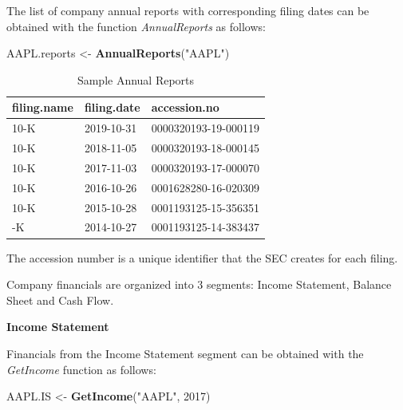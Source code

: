 \documentclass[]{book}
\newenvironment{Shaded}{\begin{snugshade}}{\end{snugshade}}
\newcommand{\KeywordTok}[1]{\textcolor[rgb]{0.13,0.29,0.53}{\textbf{#1}}}
\newcommand{\DecValTok}[1]{\textcolor[rgb]{0.00,0.00,0.81}{#1}}
\newcommand{\StringTok}[1]{\textcolor[rgb]{0.31,0.60,0.02}{#1}}
\newcommand{\NormalTok}[1]{#1}
\theoremstyle{definition}
\theoremstyle{definition}
\theoremstyle{definition}
\theoremstyle{remark}
\begin{document}
The list of company annual reports with corresponding filing dates can
be obtained with the function \emph{AnnualReports} as follows:

\begin{Shaded}
\begin{Highlighting}[]
\NormalTok{AAPL.reports <-}\StringTok{ }\KeywordTok{AnnualReports}\NormalTok{(}\StringTok{"AAPL"}\NormalTok{)}
\end{Highlighting}
\end{Shaded}

\begin{table}[t]

\caption{\label{tab:unnamed-chunk-25}Sample Annual Reports}
\centering
\begin{tabular}{lll}
\toprule
filing.name & filing.date & accession.no\\
\midrule
10-K & 2019-10-31 & 0000320193-19-000119\\
10-K & 2018-11-05 & 0000320193-18-000145\\
10-K & 2017-11-03 & 0000320193-17-000070\\
10-K & 2016-10-26 & 0001628280-16-020309\\
10-K & 2015-10-28 & 0001193125-15-356351\\
\addlinespace
10-K & 2014-10-27 & 0001193125-14-383437\\
\bottomrule
\end{tabular}
\end{table}

The accession number is a unique identifier that the SEC creates for
each filing.

Company financials are organized into 3 segments: Income Statement,
Balance Sheet and Cash Flow.

\textbf{Income Statement}

Financials from the Income Statement segment can be obtained with the
\emph{GetIncome} function as follows:

\begin{Shaded}
\begin{Highlighting}[]
\NormalTok{AAPL.IS <-}\StringTok{ }\KeywordTok{GetIncome}\NormalTok{(}\StringTok{"AAPL"}\NormalTok{, }\DecValTok{2017}\NormalTok{)}
\end{Highlighting}
\end{Shaded}
\end{document}
